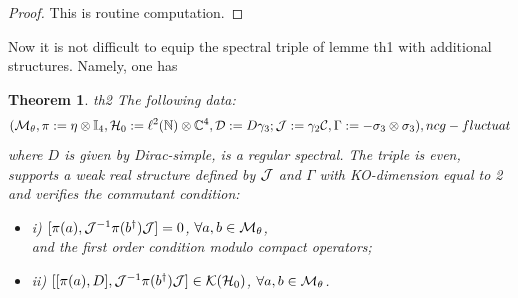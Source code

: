 \documentclass[10pt]{book}
\theoremstyle{break}
\newtheorem{theorem}{Theorem}
\begin{document}
\begin{proof}
This is routine computation.
\end{proof}
Now it is not difficult to equip the spectral triple of lemme {th1} with additional structures. Namely, one has
\begin{theorem}{th2}
The following data:
 \begin{equation}
({\cal{M}}_\theta,\pi:=\eta\otimes\mathbb{I}_4,{\cal{H}}_0:=\ell^2(\mathbb{N})\otimes\mathbb{C}^4,{\cal{D}}:=D\gamma_3;{\cal{J}}:=\gamma_2{\cal{C}},\Gamma:=-\sigma_3\otimes\sigma_3),{ncg-fluctuat}
\end{equation}
where $D$ is given by {Dirac-simple}, is a regular spectral. The triple is even, supports a weak real structure defined by ${\cal{J}}$ and $\Gamma$ with KO-dimension equal to 2 and verifies the commutant condition:
\begin{itemize}
\vspace*{-4pt}
\setlength{\itemsep}{-1pt}
\item i) $[\pi(a),{\cal{J}}^{-1}\pi(b^\dag){\cal{J}}]=0$, $\forall a,b\in{\cal{M}}_\theta$,\\
and the first order condition modulo compact operators;
\item ii) $[[\pi(a),D],{\cal{J}}^{-1}\pi(b^\dag){\cal{J}}]\in{\cal{K}}({\cal{H}}_0)$, $\forall a,b\in{\cal{M}}_\theta$.
\end{itemize}
\end{theorem}
\end{document}
